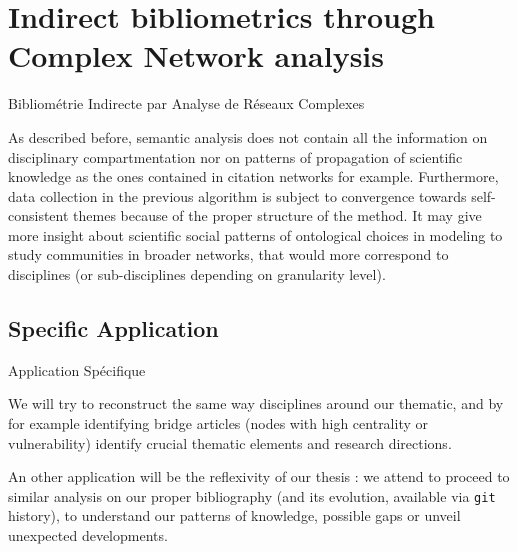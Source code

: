 \newpage


\section{Indirect bibliometrics through Complex Network analysis}{Bibliométrie Indirecte par Analyse de Réseaux Complexes}



As described before, semantic analysis does not contain all the information on disciplinary compartmentation nor on patterns of propagation of scientific knowledge as the ones contained in citation networks for example. Furthermore, data collection in the previous algorithm is subject to convergence towards self-consistent themes because of the proper structure of the method. It may give more insight about scientific social patterns of ontological choices in modeling to study communities in broader networks, that would more correspond to disciplines (or sub-disciplines depending on granularity level).












\subsection{Specific Application}{Application Spécifique}

We will try to reconstruct the same way disciplines around our thematic, and by for example identifying bridge articles (nodes with high centrality or vulnerability) identify crucial thematic elements and research directions.

\bigskip

An other application will be the reflexivity of our thesis : we attend to proceed to similar analysis on our proper bibliography (and its evolution, available via \texttt{git} history), to understand our patterns of knowledge, possible gaps or unveil unexpected developments.











